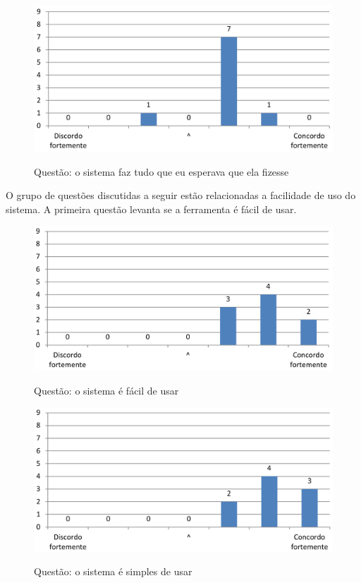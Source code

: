 \begin{figure}[ht]
\centering
\caption{Questão: o sistema faz tudo que eu esperava que ela fizesse}
\includegraphics[width=1.0\textwidth]{use/faz_esperava.pdf} 
\label{fig:faz_esperava} 
\end{figure}

O grupo de questões discutidas a seguir estão relacionadas a facilidade de uso do sistema. A primeira questão levanta se a ferramenta é fácil de usar.


\begin{figure}[ht]
\centering
\caption{Questão: o sistema é fácil de usar}
\includegraphics[width=1.0\textwidth]{use/fu_facil_usar.pdf} 
\label{fig:fu_facil_usar} 
\end{figure}


\begin{figure}[ht]
\centering
\caption{Questão: o sistema é simples de usar}
\includegraphics[width=1.0\textwidth]{use/fu_simples_usar.pdf} 
\label{fig:fu_simples_usar} 
\end{figure}


